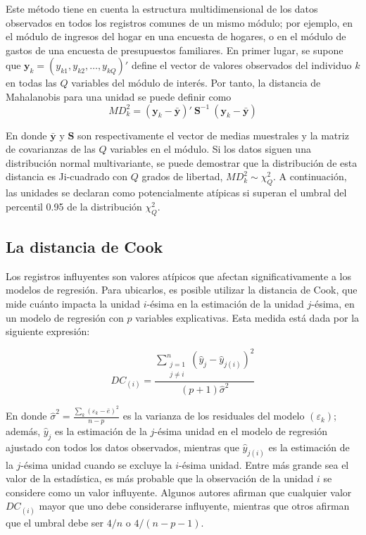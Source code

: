 \documentclass[
  12pt,
]{book}
\begin{document}
Este método tiene en cuenta la estructura multidimensional de los datos observados en todos los registros comunes de un mismo módulo; por ejemplo, en el módulo de ingresos del hogar en una encuesta de hogares, o en el módulo de gastos de una encuesta de presupuestos familiares. En primer lugar, se supone que \(\mathbf{y}_k = (y_{k1}, y_{k2}, \ldots, y_{kQ} )'\) define el vector de valores observados del individuo \(k\) en todas las \(Q\) variables del módulo de interés. Por tanto, la distancia de Mahalanobis para una unidad se puede definir como
\[
MD_k^2=(\mathbf{y}_k-\bar{\mathbf{y}})' \ \mathbf{S}^{-1} \ (\mathbf{y}_k-\bar{\mathbf{y}})
\]

En donde \(\bar{\mathbf{y}}\) y \(\mathbf{S}\) son respectivamente el vector de medias muestrales y la matriz de covarianzas de las \(Q\) variables en el módulo. Si los datos siguen una distribución normal multivariante, se puede demostrar que la distribución de esta distancia es Ji-cuadrado con \(Q\) grados de libertad, \(MD_k^2 \sim \chi_Q^2\). A continuación, las unidades se declaran como potencialmente atípicas si superan el umbral del percentil 0.95 de la distribución \(\chi_{Q}^2\).

\hypertarget{la-distancia-de-cook}{%
\subsection{La distancia de Cook}\label{la-distancia-de-cook}}

Los registros influyentes son valores atípicos que afectan significativamente a los modelos de regresión. Para ubicarlos, es posible utilizar la distancia de Cook, que mide cuánto impacta la unidad \(i\)-ésima en la estimación de la unidad \(j\)-ésima, en un modelo de regresión con \(p\) variables explicativas. Esta medida está dada por la siguiente expresión:

\[
DC_{(i)} = \dfrac{\sum_{\substack{j=1\\ j\neq i}}^{n}(\hat y_j- \hat y_{j(i)})^2}{(p+1) \hat{\sigma}^2} 
\]

En donde \(\hat{\sigma}^2 = \frac{\sum_k (\varepsilon_k - \bar{e})^2}{n-p}\) es la varianza de los residuales del modelo \((\varepsilon_k)\); además, \(\hat y_j\) es la estimación de la \(j\)-ésima unidad en el modelo de regresión ajustado con todos los datos observados, mientras que \(\hat y_{j(i)}\) es la estimación de la \(j\)-ésima unidad cuando se excluye la \(i\)-ésima unidad. Entre más grande sea el valor de la estadística, es más probable que la observación de la unidad \(i\) se considere como un valor influyente. Algunos autores afirman que cualquier valor \(DC_{(i)}\) mayor que uno debe considerarse influyente, mientras que otros afirman que el umbral debe ser \(4/n\) o \(4/(n-p-1)\).
\end{document}
